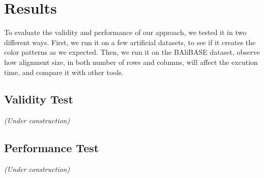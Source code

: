 \chapter{Results}\label{chap:Results}

To evaluate the validity and performance of our approach, we tested it in two different ways. First, we run it on a few artificial datasets, to see if it creates the color patterns as we expected. Then, we run it on the BAliBASE dataset, observe how alignment size, in both number of rows and columns, will affect the excution time, and compare it with other tools.

\section{Validity Test}

\emph{(Under construction)}

\section{Performance Test}

\emph{(Under construction)}
